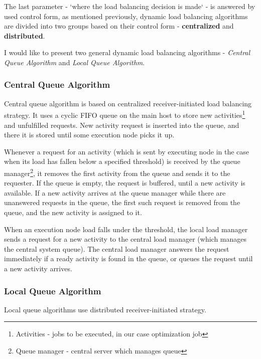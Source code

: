 \smallskip
The last parameter - `where the load balancing decision is made` - is answered by used control form,
as mentioned previously,
dynamic load balancing algorithms are divided into two groups based on their control form - \textbf{centralized} and \textbf{distributed}.

\medskip
\noindent I would like to present two general dynamic load balancing algorithms - \textit{Central Queue Algorithm} and \textit{Local Queue Algorithm}.

\subsubsection{Central Queue Algorithm}
Central queue algorithm is based on centralized receiver-initiated load balancing strategy.
It uses a cyclic FIFO queue on the main host to store new activities\footnote{Activities - jobs to be executed, in our case optimization job}
and unfulfilled requests.
New activity request is inserted into the queue, and there it is stored until some execution node picks it up.

Whenever a request for an activity (which is sent by executing node in the case when its load has fallen below a specified threshold)
is received by the queue manager\footnote{Queue manager - central server which manages queue},
it removes the first activity from the queue and sends it to the requester.
If the queue is empty, the request is buffered, until a new activity is available.
If a new activity arrives at the queue manager while there are unanswered requests in the queue,
the first such request is removed from the queue, and the new activity is assigned to it.

When an execution node load falls under the threshold,
the local load manager sends a request for a new activity to the central load manager (which manages the central system queue).
The central load manager answers the request immediately if a ready activity is found in the queue,
or queues the request until a new activity arrives\cite{sharma2008performance}.


\subsubsection{Local Queue Algorithm}
Local queue algorithms use distributed receiver-initiated strategy.

